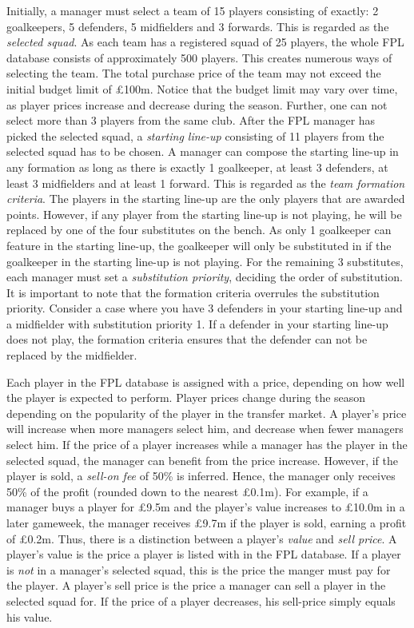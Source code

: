 \newpar

Initially, a manager must select a team of 15 players consisting of exactly: 2 goalkeepers, 5 defenders, 5 midfielders and 3 forwards. This is regarded as the \textit{selected squad}. As each team has a registered squad of 25 players, the whole FPL database consists of approximately 500 players. This creates numerous ways of selecting the team. The total purchase price of the team may not exceed the initial budget limit of \pounds 100m. Notice that the budget limit may vary over time, as player prices increase and decrease during the season. Further, one can not select more than 3 players from the same club. After the FPL manager has picked the selected squad, a \textit{starting line-up} consisting of 11 players from the selected squad has to be chosen. A manager can compose the starting line-up in any formation as long as there is exactly 1 goalkeeper, at least 3 defenders, at least 3 midfielders and at least 1 forward. This is regarded as the \textit{team formation criteria}. The players in the starting line-up are the only players that are awarded points. However, if any player from the starting line-up is not playing, he will be replaced by one of the four substitutes on the bench. As only 1 goalkeeper can feature in the starting line-up, the goalkeeper will only be substituted in if the goalkeeper in the starting line-up is not playing. For the remaining 3 substitutes, each manager must set a \textit{substitution priority}, deciding the order of substitution. It is important to note that the formation criteria overrules the substitution priority. Consider a case where you have 3 defenders in your starting line-up and a midfielder with substitution priority 1. If a defender in your starting line-up does not play, the formation criteria ensures that the defender can not be replaced by the midfielder. 

\newpar

Each player in the FPL database is assigned with a price, depending on how well the player is expected to perform. Player prices change during the season depending on the popularity of the player in the transfer market. A player's price will increase when more managers select him, and decrease when fewer managers select him. If the price of a player increases while a manager has the player in the selected squad, the manager can benefit from the price increase. However, if the player is sold, a \textit{sell-on fee} of 50\% is inferred. Hence, the manager only receives 50\% of the profit (rounded down to the nearest \pounds 0.1m). For example, if a manager buys a player for \pounds 9.5m and the player's value increases to \pounds 10.0m in a later gameweek, the manager receives \pounds 9.7m if the player is sold, earning a profit of \pounds 0.2m. Thus, there is a distinction between a player's \textit{value} and \textit{sell price}. A player's value is the price a player is listed with in the FPL database. If a player is \textit{not} in a manager's selected squad, this is the price the manger must pay for the player. A player's sell price is the price a manager can sell a player in the selected squad for. If the price of a player decreases, his sell-price simply equals his value.



